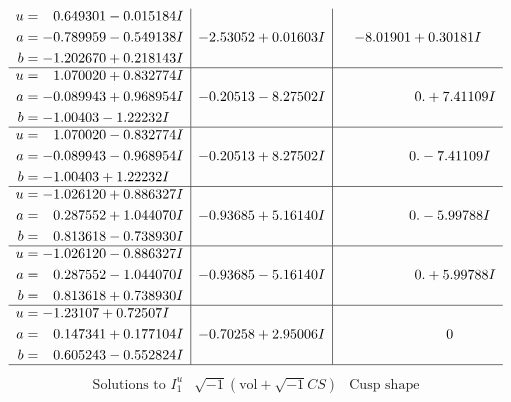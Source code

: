\documentclass[1p]{elsarticle_modified}
\theoremstyle{definition}
\newcommand{\I}{\sqrt{-1}}
\begin{document}
$$\begin{array}{c|c|c}
\begin{aligned}
u &= \phantom{-}0.649301 - 0.015184 I \\
a &= -0.789959 - 0.549138 I \\
b &= -1.202670 + 0.218143 I\end{aligned}
 & -2.53052 + 0.01603 I & -8.01901 + 0.30181 I \\ \hline\begin{aligned}
u &= \phantom{-}1.070020 + 0.832774 I \\
a &= -0.089943 + 0.968954 I \\
b &= -1.00403 - 1.22232 I\end{aligned}
 & -0.20513 - 8.27502 I & \phantom{-0.000000 -}0. + 7.41109 I \\ \hline\begin{aligned}
u &= \phantom{-}1.070020 - 0.832774 I \\
a &= -0.089943 - 0.968954 I \\
b &= -1.00403 + 1.22232 I\end{aligned}
 & -0.20513 + 8.27502 I & \phantom{-0.000000 } 0. - 7.41109 I \\ \hline\begin{aligned}
u &= -1.026120 + 0.886327 I \\
a &= \phantom{-}0.287552 + 1.044070 I \\
b &= \phantom{-}0.813618 - 0.738930 I\end{aligned}
 & -0.93685 + 5.16140 I & \phantom{-0.000000 } 0. - 5.99788 I \\ \hline\begin{aligned}
u &= -1.026120 - 0.886327 I \\
a &= \phantom{-}0.287552 - 1.044070 I \\
b &= \phantom{-}0.813618 + 0.738930 I\end{aligned}
 & -0.93685 - 5.16140 I & \phantom{-0.000000 -}0. + 5.99788 I \\ \hline\begin{aligned}
u &= -1.23107 + 0.72507 I \\
a &= \phantom{-}0.147341 + 0.177104 I \\
b &= \phantom{-}0.605243 - 0.552824 I\end{aligned}
 & -0.70258 + 2.95006 I & \phantom{-0.000000 } 0\\
 \hline 
 \end{array}$$\newpage$$\begin{array}{c|c|c}  
\text{Solutions to }I^u_{1}& \I (\text{vol} + \sqrt{-1}CS) & \text{Cusp shape}\\
 \hline 
\begin{aligned}

\end{aligned}
\end{array}$$
\end{document}
